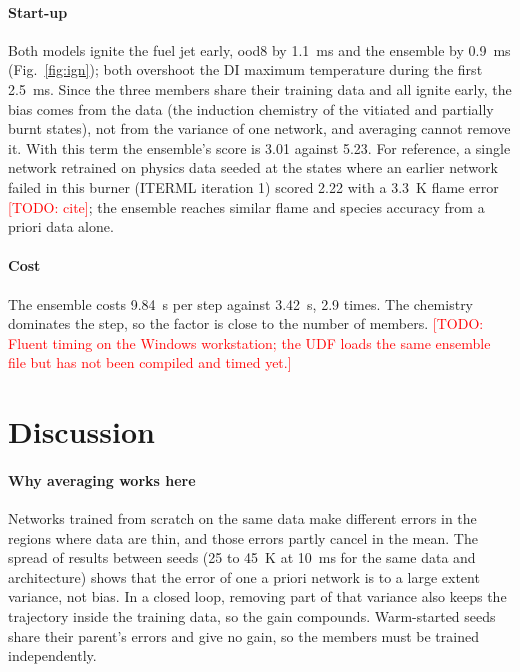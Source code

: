 \documentclass[preprint,review,12pt]{elsarticle}
\newcommand{\todo}[1]{\textcolor{red}{[TODO: #1]}}
\begin{document}
\paragraph{Start-up}
Both models ignite the fuel jet early, ood8 by 1.1~ms and the ensemble by 0.9~ms
(Fig.~\ref{fig:ign}); both overshoot the DI maximum temperature during the first 2.5~ms. Since the three
members share their training data and all ignite early, the bias comes from the data (the induction
chemistry of the vitiated and partially burnt states), not from the variance of one network, and
averaging cannot remove it. With this term the ensemble's score is 3.01 against 5.23. For reference, a
single network retrained on physics data seeded at the states where an earlier network failed in this
burner (ITERML iteration 1) scored 2.22 with a 3.3~K flame error \todo{cite}; the ensemble reaches similar
flame and species accuracy from a priori data alone.

\paragraph{Cost}
The ensemble costs 9.84~s per step against 3.42~s, 2.9 times. The chemistry dominates the step, so the
factor is close to the number of members. \todo{Fluent timing on the Windows workstation; the UDF loads
the same ensemble file but has not been compiled and timed yet.}

\section{Discussion}
\label{sec:disc}

\paragraph{Why averaging works here}
Networks trained from scratch on the same data make different errors in the regions where data are
thin, and those errors partly cancel in the mean. The spread of results between seeds (25 to 45~K at
10~ms for the same data and architecture) shows that the error of one a priori network is to a large
extent variance, not bias. In a closed loop, removing part of that variance also keeps the trajectory
inside the training data, so the gain compounds. Warm-started seeds share their parent's errors and
give no gain, so the members must be trained independently.
\end{document}
